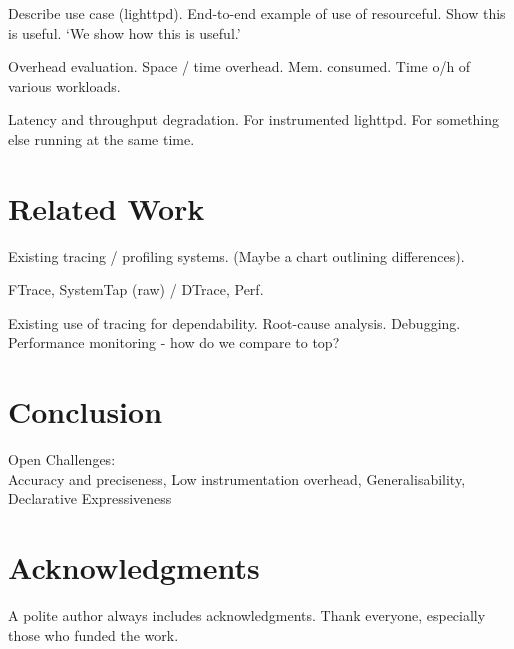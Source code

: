 \documentclass[letterpaper,twocolumn,10pt]{article}
\begin{document}
Describe use case (lighttpd).\newline
End-to-end example of use of resourceful. Show this is useful. `We show how this
is useful.'

Overhead evaluation.\newline
Space / time overhead. Mem. consumed. Time o/h of various workloads.

Latency and throughput degradation.\newline
For instrumented lighttpd. For something else running at the same time.


\section{Related Work}
Existing tracing / profiling systems. (Maybe a chart outlining differences).

FTrace, SystemTap (raw) / DTrace, Perf.

Existing use of tracing for dependability.\newline
Root-cause analysis. Debugging. Performance monitoring - how do we compare to
top?

\section{Conclusion}
Open Challenges:\\
Accuracy and preciseness,
Low instrumentation overhead,
Generalisability,
Declarative Expressiveness

\section{Acknowledgments}

A polite author always includes acknowledgments.  Thank everyone,
especially those who funded the work.



{\footnotesize 
}
\end{document}
